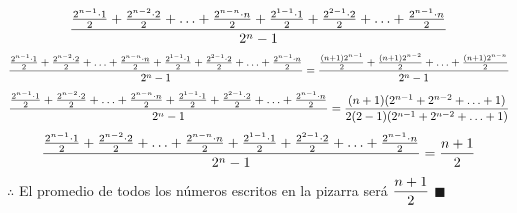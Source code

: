 \documentclass{book}
\begin{document}
\begin{enumerate}
          $$\frac{{2^{n-1}\cdot 1\over 2}+{2^{n-2}\cdot 2\over 2}+\ldots+{2^{n-n}\cdot n\over 2}+{2^{1-1}\cdot 1\over 2}+{2^{2-1}\cdot 2\over 2}+\ldots+{2^{n-1}\cdot n\over 2}}{2^n-1}$$
          $$\frac{{2^{n-1}\cdot 1\over 2}+{2^{n-2}\cdot 2\over 2}+\ldots+{2^{n-n}\cdot n\over 2}+{2^{1-1}\cdot 1\over 2}+{2^{2-1}\cdot 2\over 2}+\ldots+{2^{n-1}\cdot n\over 2}}{2^n-1}=\frac{{(n+1)2^{n-1}\over 2}+{(n+1)2^{n-2}\over 2}+\ldots+{(n+1)2^{n-n}\over 2}}{2^n-1}$$
          $$\frac{{2^{n-1}\cdot 1\over 2}+{2^{n-2}\cdot 2\over 2}+\ldots+{2^{n-n}\cdot n\over 2}+{2^{1-1}\cdot 1\over 2}+{2^{2-1}\cdot 2\over 2}+\ldots+{2^{n-1}\cdot n\over 2}}{2^n-1}=\frac{(n+1)(2^{n-1}+2^{n-2}+\ldots+1)}{2(2-1)(2^{n-1}+2^{n-2}+\ldots+1)}$$
          $$\frac{{2^{n-1}\cdot 1\over 2}+{2^{n-2}\cdot 2\over 2}+\ldots+{2^{n-n}\cdot n\over 2}+{2^{1-1}\cdot 1\over 2}+{2^{2-1}\cdot 2\over 2}+\ldots+{2^{n-1}\cdot n\over 2}}{2^n-1}={n+1 \over 2}$$
          $\therefore$ El promedio de todos los números escritos en la pizarra será $\displaystyle{{n+1 \over 2}}$ $\blacksquare$\\
\end{enumerate}
\end{document}
